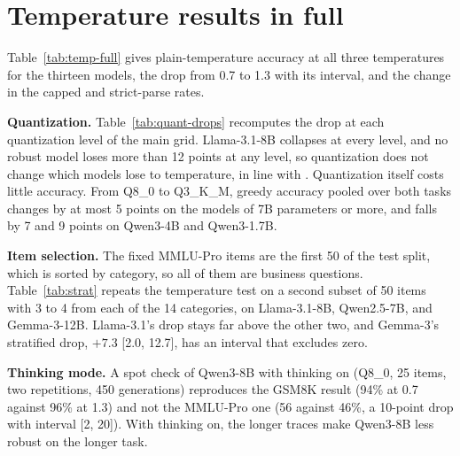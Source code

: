 \documentclass[10pt]{article}
\begin{document}
\begin{table}[t]\centering
\caption{Parse outcomes under plain temperature sampling at Q8\_0 (\% of generations,
rounded): strict, flexible, failed, and capped (capped overlaps the other three).}
\label{tab:decomp}
\footnotesize\setlength{\tabcolsep}{5pt}
\end{table}

\begin{table}[t]\centering
\caption{Accuracy among strict-parsed generations under plain temperature sampling at Q8\_0,
with the share of generations that parse strictly, the number $n$ of such generations at
$T{=}1.3$ (of 150), and greedy accuracy on their items with each surviving generation counted
once. Point estimates without intervals.}
\label{tab:survivor}
\footnotesize\setlength{\tabcolsep}{4pt}
\end{table}


\section{Temperature results in full}
\label{app:temp}

Table~\ref{tab:temp-full} gives plain-temperature accuracy at all three temperatures for the
thirteen models, the drop from 0.7 to 1.3 with its interval, and the change in the capped and
strict-parse rates.

\textbf{Quantization.} Table~\ref{tab:quant-drops} recomputes the drop at each quantization
level of the main grid. Llama-3.1-8B collapses at every level, and no robust model loses more
than 12 points at any level, so quantization does not change which models lose to temperature,
in line with \citet{prasad2026quantization}. Quantization itself costs little accuracy. From
Q8\_0 to Q3\_K\_M, greedy accuracy pooled over both tasks changes by
at most 5 points on the models of 7B parameters or more, and falls by 7 and 9 points on Qwen3-4B
and Qwen3-1.7B.

\textbf{Item selection.} The fixed MMLU-Pro items are the first 50 of the test split, which is
sorted by category, so all of them are business questions. Table~\ref{tab:strat} repeats the
temperature test on a second subset of 50 items with 3 to 4 from each of the 14 categories, on
Llama-3.1-8B, Qwen2.5-7B, and Gemma-3-12B. Llama-3.1's drop stays far above the other two, and
Gemma-3's stratified drop, $+7.3$ [2.0, 12.7], has an interval that excludes zero.

\textbf{Thinking mode.} A spot check of Qwen3-8B with thinking on (Q8\_0, 25 items, two
repetitions, 450 generations) reproduces the GSM8K result (94\% at 0.7 against 96\% at 1.3) and
not the MMLU-Pro one (56 against 46\%, a 10-point drop with interval [2, 20]). With thinking on,
the longer traces make Qwen3-8B less robust on the longer task.
\end{document}
